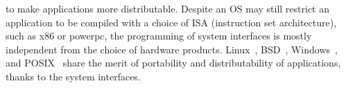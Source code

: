 to make applications more distributable.
Despite an OS may still restrict an application to be compiled with a choice of ISA (instruction set architecture), such as x86 or powerpc,
the programming of system interfaces is mostly independent
from the choice of hardware products.
Linux~\cite{linux-standard-base}, BSD~\cite{quarterman85bsd}, Windows~\cite{win-api},
and POSIX~\cite{ieee-posix}
share the merit of portability and distributability
of applications,
thanks to the system interfaces.



